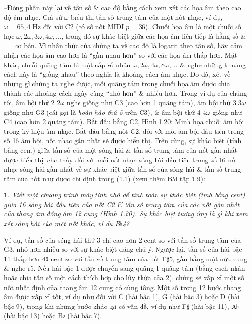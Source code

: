 \documentclass{article}
\newtheorem{baitoan}{}
\begin{document}
\begin{itemize}
\begin{itemize}
\begin{itemize}
			--Đóng phần này lại về tần số \& cao độ bằng cách xem xét các họa âm theo cao độ âm nhạc. Giả sử $\omega$ biểu thị tần số trung tâm của một nốt nhạc, ví dụ, $\omega = 65,4$ Hz đối với C2 (có số nốt MIDI $p = 36$). Chuỗi họa âm là một chuỗi số học $\omega,2\omega,3\omega,4\omega,\ldots$, trong đó sự khác biệt giữa các họa âm liên tiếp là hằng số \& $=$ cơ bản. Vì nhận thức của chúng ta về cao độ là logarit theo tần số, hãy cảm nhận các họa âm cao hơn là ``gần nhau hơn'' so với các họa âm thấp hơn. Mặt khác, chuỗi quãng tám là một cấp số nhân $\omega,2\omega,4\omega,8\omega,\ldots$ \& nghe những khoảng cách này là ``giống nhau'' theo nghĩa là khoảng cách âm nhạc. Do đó, xét về những gì chúng ta nghe được, mỗi quãng tám trong chuỗi họa âm được chia thành các khoảng cách ngày càng ``nhỏ hơn'' \& nhiều hơn. Trong ví dụ của chúng tôi, âm bội thứ 2 $2\omega$ nghe giống như C3 (cao hơn 1 quãng tám), âm bội thứ 3 $3\omega$ giống như G3 (cái gọi là {\it hoàn hảo thứ 5} trên C3), \& âm bội thứ 4 $4\omega$ giống như C4 (cao hơn 2 quãng tám). Bắt đầu bằng C2, {\sf Hình 1.20: Minh họa chuỗi âm bội trong ký hiệu âm nhạc. Bắt đầu bằng nốt C2, đối với mỗi âm bội đầu tiên trong số 16 âm bội, nốt nhạc gần nhất sẽ được hiển thị. Trên cùng, sự khác biệt (tính bằng cent) giữa tần số của một sóng hài \& tần số trung tâm của nốt gần nhất được hiển thị.} cho thấy đối với mỗi nốt nhạc sóng hài đầu tiên trong số 16 nốt nhạc sóng hài gần nhất về sự khác biệt giữa tần số của sóng hài \& tần số trung tâm của nốt như được chỉ định trong (1.1) (xem thêm Bài tập 1.9):
			\begin{baitoan}
				Viết một chương trình máy tính nhỏ để tính toán sự khác biệt (tính bằng cent) giữa 16 sóng hài đầu tiên của nốt C2 \& tần số trung tâm của các nốt gần nhất của thang âm đồng âm 12 cung ({\sf Hình 1.20}). Sự khác biệt tương ứng là gì khi xem xét sóng hài của một nốt khác, ví dụ B$\flat$4?
			\end{baitoan}
			Ví dụ, tần số của sóng hài thứ 3 chỉ cao hơn 2 cent so với tần số trung tâm của G3, nhỏ hơn nhiều so với sự khác biệt đáng chú ý. Ngược lại, tần số của hài bậc 11 thấp hơn 49 cent so với tần số trung tâm của nốt F$\sharp$5, gần bằng một nửa cung \& nghe rõ. Nếu hài bậc 1 được chuyển sang quãng 1 quãng tám (bằng cách nhân hoặc chia tần số một cách thích hợp cho lũy thừa của 2), chúng sẽ xấp xỉ một số nốt nhất định của thang âm 12 cung có cùng tông. Một số trong 12 bước thang âm được xấp xỉ tốt, ví dụ như đối với C (hài bậc 1), G (hài bậc 3) hoặc D (hài bậc 9), trong khi những bước khác lại có vấn đề, ví dụ như F$\sharp$ (hài bậc 11), A$\flat$ (hài bậc 13) hoặc B$\flat$ (hài bậc 7).

\end{itemize}
\end{itemize}
\end{itemize}
\end{document}
